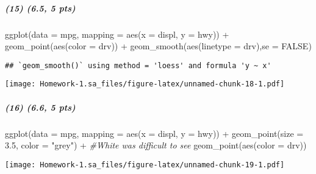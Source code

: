 \documentclass[
]{article}
\newenvironment{Shaded}{\begin{snugshade}}{\end{snugshade}}
\newcommand{\AttributeTok}[1]{\textcolor[rgb]{0.77,0.63,0.00}{#1}}
\newcommand{\CommentTok}[1]{\textcolor[rgb]{0.56,0.35,0.01}{\textit{#1}}}
\newcommand{\ConstantTok}[1]{\textcolor[rgb]{0.00,0.00,0.00}{#1}}
\newcommand{\FloatTok}[1]{\textcolor[rgb]{0.00,0.00,0.81}{#1}}
\newcommand{\FunctionTok}[1]{\textcolor[rgb]{0.00,0.00,0.00}{#1}}
\newcommand{\NormalTok}[1]{#1}
\newcommand{\SpecialCharTok}[1]{\textcolor[rgb]{0.00,0.00,0.00}{#1}}
\newcommand{\StringTok}[1]{\textcolor[rgb]{0.31,0.60,0.02}{#1}}
\begin{document}
\hypertarget{pts-4}{%
\subparagraph{(15) (6.5, 5 pts)}\label{pts-4}}

\begin{Shaded}
\begin{Highlighting}[]
\FunctionTok{ggplot}\NormalTok{(}\AttributeTok{data =}\NormalTok{ mpg, }\AttributeTok{mapping =} \FunctionTok{aes}\NormalTok{(}\AttributeTok{x =}\NormalTok{ displ, }\AttributeTok{y =}\NormalTok{ hwy)) }\SpecialCharTok{+} 
  \FunctionTok{geom\_point}\NormalTok{(}\FunctionTok{aes}\NormalTok{(}\AttributeTok{color =}\NormalTok{ drv)) }\SpecialCharTok{+} 
  \FunctionTok{geom\_smooth}\NormalTok{(}\FunctionTok{aes}\NormalTok{(}\AttributeTok{linetype =}\NormalTok{ drv),}\AttributeTok{se =} \ConstantTok{FALSE}\NormalTok{)}
\end{Highlighting}
\end{Shaded}

\begin{verbatim}
## `geom_smooth()` using method = 'loess' and formula 'y ~ x'
\end{verbatim}

\texttt{[image: Homework-1.sa\_files/figure-latex/unnamed-chunk-18-1.pdf]}

\hypertarget{pts-5}{%
\subparagraph{(16) (6.6, 5 pts)}\label{pts-5}}

\begin{Shaded}
\begin{Highlighting}[]
\FunctionTok{ggplot}\NormalTok{(}\AttributeTok{data =}\NormalTok{ mpg, }\AttributeTok{mapping =} \FunctionTok{aes}\NormalTok{(}\AttributeTok{x =}\NormalTok{ displ, }\AttributeTok{y =}\NormalTok{ hwy)) }\SpecialCharTok{+} 
  \FunctionTok{geom\_point}\NormalTok{(}\AttributeTok{size =} \FloatTok{3.5}\NormalTok{, }\AttributeTok{color =} \StringTok{"grey"}\NormalTok{) }\SpecialCharTok{+} \CommentTok{\#White was difficult to see}
  \FunctionTok{geom\_point}\NormalTok{(}\FunctionTok{aes}\NormalTok{(}\AttributeTok{color =}\NormalTok{ drv))}
\end{Highlighting}
\end{Shaded}

\texttt{[image: Homework-1.sa\_files/figure-latex/unnamed-chunk-19-1.pdf]}
\end{document}

